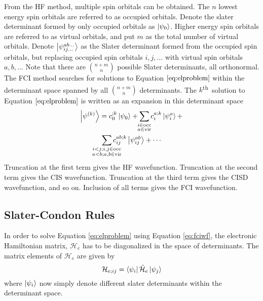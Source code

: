 \documentclass[final,3p,times,twocolumn]{elsarticle}
\newcommand{\ssth}{\textsuperscript{th}}
\newcommand{\ham}{\hat{\mathcal{H}}}
\begin{document}
From the HF method,\cite{roothaan} multiple spin orbitals can be obtained. The $n$ lowest energy spin orbitals are referred to as occupied orbitals. Denote the slater determinant formed by only occupied orbitals as $\ket{\psi_0}$. Higher energy spin orbitals are referred to as virtual orbitals, and put $m$ as the total number of virtual orbitals. Denote $\ket{\psi_{ij\ldots}^{ab\ldots}}$ as the Slater determinant formed from the occupied spin orbitals, but replacing occupied spin orbitals $i, j, \ldots$ with virtual spin orbitals $a, b, \ldots$ Note that there are $\binom{n+m}{n}$ possible Slater determinants, all orthonormal. The FCI method searches for solutions to Equation $\ref{eq:elproblem}$ within the determinant space spanned by all $\binom{n+m}{n}$ determinants. The $k$\ssth\ solution to Equation $\eqref{eq:elproblem}$ is written as an expansion in this determinant space
\begin{equation}\label{eq:fciwf}
\begin{gathered}
\ket{\psi^{(k)}} = c_0^{;k}\ket{\psi_0} + \sum_{\mathclap{\substack{i\in\text{occ} \\ a \in\text{vir}}}} c_i^{a;k}\ket{\psi_i^a} + \\
\sum_{\mathclap{\substack{i < j; i, j \in\text{occ} \\ a < b; a, b \in\text{vir}}}} c_{ij}^{ab;k}\ket{\psi_{ij}^{ab}} 
+ \cdots
\end{gathered}
\end{equation}
Truncation at the first term gives the HF wavefunction. Truncation at the second term gives the CIS wavefunction. Truncation at the third term gives the CISD wavefunction, and so on. Inclusion of all terms gives the FCI wavefunction.

\subsection{Slater-Condon Rules} \label{sec:condonrules}
In order to solve Equation \eqref{eq:elproblem} using Equation \eqref{eq:fciwf}, the electronic Hamiltonian matrix, $\mathcal H_e$ has to be diagonalized in the space of determinants. The matrix elements of $\mathcal H_e$ are given by
\begin{equation} \label{eq:hmat}
\mathcal H_{e;ij} = \bra{\psi_i}\ham_e\ket{\psi_j}
\end{equation}
where $\ket{\psi_i}$ now simply denote different slater determinants within the determinant space.
\end{document}
